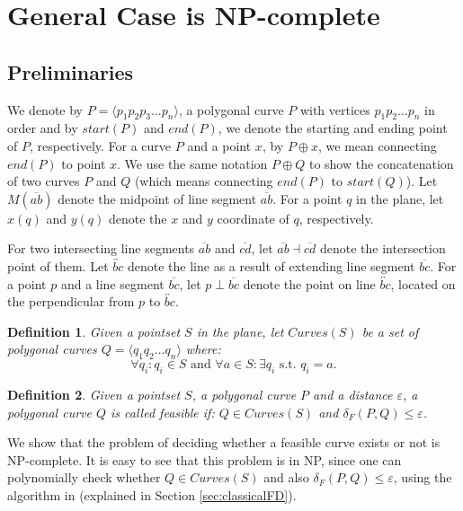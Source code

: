 \documentclass[12pt]{dalthesis}
\newtheorem{definition}{Definition}
\newcommand{\eps}{\varepsilon}
\newcommand{\distF}{\delta_F}
\newcommand{\pset}{S}
\newcommand{\ap}{\oplus}
\newcommand{\Seg}[1]{{\overline{#1}}}
\begin{document}
\section{General Case is NP-complete}
\label{sec:NPComp}

\subsection{Preliminaries}
We denote by $P = \langle p_1p_2p_3...p_n \rangle$, a polygonal curve $P$
with vertices $p_1 p_2 \dots p_n$ in order 
and by $start(P)$ and $end(P)$, we denote 
the starting and ending point of $P$, respectively.
For a curve $P$ and a point $x$, by $P \ap x$, 
we mean connecting $end(P)$ to point $x$.
We use the same notation $P \ap Q$ 
to show the concatenation of 
two curves $P$ and $Q$ (which means connecting $end(P)$ to $start(Q)$).
Let $M(\Seg{ab})$ denote the  midpoint of line segment $\Seg{ab}$. 
For a point $q$ in the plane, let $x(q)$ and $y(q)$
denote the $x$ and $y$ coordinate of $q$, respectively.


For two intersecting line segments $\Seg{ab}$ and $\Seg{cd}$, let $ \Seg{ab} \dashv	\Seg{cd}$ denote the intersection point of them.
Let $\overleftrightarrow{bc}$ denote the line as a result of 
extending line segment $\Seg{bc}$.
For a point $p$ and a line segment $\Seg{bc}$,
let $p \perp \Seg{bc}$ denote the point on
line $\overleftrightarrow{bc}$,
located on the perpendicular from $p$ to $\overleftrightarrow{bc}$.


\begin{definition} \label{def:curves}
Given a pointset $\pset$ in the plane, let $Curves(\pset)$
be a set of polygonal curves $Q = \langle q_1 q_2 \dots q_n \rangle$ where: 
$$  \forall{q_i} : q_i \in \pset \mbox{  and  } 
  \forall{a} \in \pset: \exists{q_i} \mbox{  s.t. }  q_i = a. $$
\end{definition}

\begin{definition} \label{def:feasibleNPC}
Given a pointset $\pset$, a polygonal curve $P$ and a distance $\eps$, 
a polygonal curve $Q$ is called {\em feasible} if: 
$Q \in Curves(S)$ and $  \distF(P,Q) \le \eps$.
\end{definition}

We show that the problem of deciding whether a 
feasible curve exists or not  is NP-complete.
It is easy to see that this problem is in NP, since 
one can polynomially check whether $Q \in Curves(S)$
and also $\distF(P,Q) \le \eps$, using the algorithm in \cite{AltG95} 
(explained in Section \ref{sec:classicalFD}).
\end{document}
